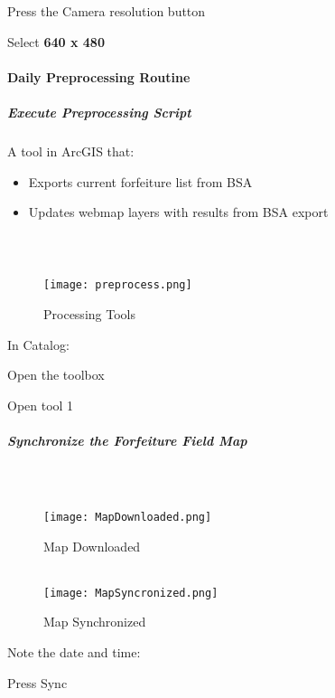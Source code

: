 \documentclass[class=article , crop=false, titlepage, twoside, multi={itemize, figure, verbatim}, float=false]{standalone}
\begin{document}
\noindent Press the \Large Camera resolution \normalsize button\\
\vspace{3in}

\noindent Select \textbf{\LARGE 640 x 480}\\
\clearpage
\paragraph{Daily Preprocessing Routine}

\subparagraph{Execute Preprocessing Script}A tool in ArcGIS that:

\begin{itemize}

\item Exports current forfeiture list from BSA
\item Updates webmap layers with results from BSA export

\end{itemize}

\subparagraph*{\\}
\begin{wrapfigure}{r}{0.75\textwidth}
\centering
\texttt{[image: preprocess.png]}
\caption{Processing Tools}
\end{wrapfigure}
In Catalog:\\
\vspace{1in}

\noindent Open the toolbox\\
\vspace{1in}

\noindent Open tool 1\\


\clearpage
\subparagraph{Synchronize the Forfeiture Field Map\\}

\subparagraph*{\\}
\begin{wrapfigure}{r}{0.5\textwidth}
\centering
\texttt{[image: MapDownloaded.png]}
\caption{Map Downloaded}
\vspace{.25in}
\HRule \\[.4cm] %
\vspace{.25in}
\texttt{[image: MapSyncronized.png]}
\caption{Map Synchronized}
\end{wrapfigure}
\Large Note the date and time:
\vspace{1.5in}

\noindent Press \Large Sync
\vspace{1.5in}
\end{document}
